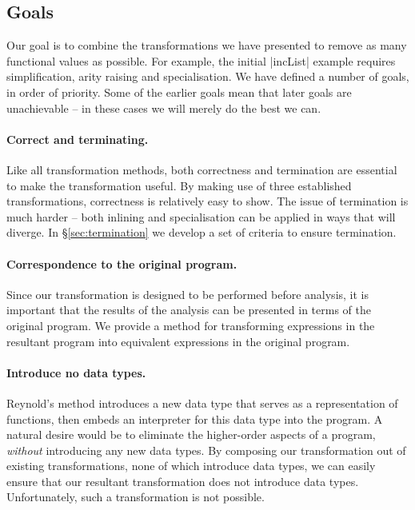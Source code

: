 \documentclass[preprint]{sigplanconf}
\begin{document}
\subsection{Goals}
\label{sec:goals}

Our goal is to combine the transformations we have  presented to remove as many functional values as possible. For example, the initial |incList| example requires simplification, arity raising and specialisation. We have defined a number of goals, in order of priority. Some of the earlier goals mean that later goals are unachievable -- in these cases we will merely do the best we can.

\paragraph{Correct and terminating.} Like all transformation methods, both correctness and termination are essential to make the transformation useful. By making use of three established transformations, correctness is relatively easy to show. The issue of termination is much harder -- both inlining and specialisation can be applied in ways that will diverge. In \S\ref{sec:termination} we develop a set of criteria to ensure termination.

\paragraph{Correspondence to the original program.} Since our transformation is designed to be performed before analysis, it is important that the results of the analysis can be presented in terms of the original program. We provide a method for transforming expressions in the resultant program into equivalent expressions in the original program.

\paragraph{Introduce no data types.} Reynold's method introduces a new data type that serves as a representation of functions, then embeds an interpreter for this data type into the program. A natural desire would be to eliminate the higher-order aspects of a program, \textit{without} introducing any new data types. By composing our transformation out of existing transformations, none of which introduce data types, we can easily ensure that our resultant transformation does not introduce data types. Unfortunately, such a transformation is not possible.
\end{document}
